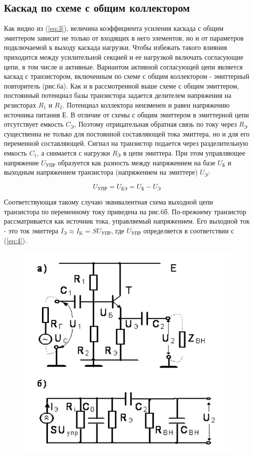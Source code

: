 \subsection{Каскад по схеме с общим коллектором}
Как видно из (\ref{eq:3}), величина коэффициента усиления каскада с общим эмиттером зависит не только от входящих в него элементов, но и от параметров подключаемой к выходу каскада нагрузки. Чтобы избежать такого влияния приходится между усилительной секцией и ее нагрузкой включать согласующие цепи, в том числе и активные. Вариантом активной согласующей цепи является каскад с транзистором, включенным по схеме с общим коллектором - эмиттерный повторитель (рис.6а). Как и в рассмотренной выше схеме с общим эмиттером, постоянный потенциал базы транзистора задается делителем напряжения на резисторах $R_1$ и $R_2$. Потенциал коллектора неизменен и равен напряжению источника питания Е. В отличие от схемы с общим эмиттером в эмиттерной цепи отсутствует емкость $C_{\text{Э}}$, Поэтому отрицательная обратная связь по току через $R_{\text{Э}}$ существенна не только для постоянной составляющей тока эмиттера, но и для его переменной составляющей. Сигнал на транзистор подается через разделительную емкость $C_1$, а снимается с нагрузки $R_{\text{Э}}$ в цепи эмиттера. При этом управляющее напряжение $U_{\text{УПР}}$ образуется как разность между напряжением на базе $U_{\text{Б}}$ и выходным напряжением транзистора (напряжением на эмиттере) $U_{\text{Э}}$:

\begin{equation}
	U_{\text{УПР}}=U_{\text{БЭ}}=U_{\text{Б}}-U_{\text{Э}}
	\label{eq:4}
\end{equation}

Соответствующая такому случаю эквивалентная схема выходной цепи транзистора по переменному току приведена на рис.6б. По-прежнему транзистор рассматривается как источник тока, управляемый напряжением. Его выходной ток - это ток эмиттера $I_{\text{Э}} \approx I_{\text{K}}=SU_{\text{УПР}}$, где $U_{\text{УПР}}$ определяется в соответствии с (\ref{eq:4}).

\begin{figure}[ht]
	\centering
	\includegraphics[width=0.6\linewidth]{fig/fig6}
	\caption{}
	\label{fig:6}
\end{figure}

